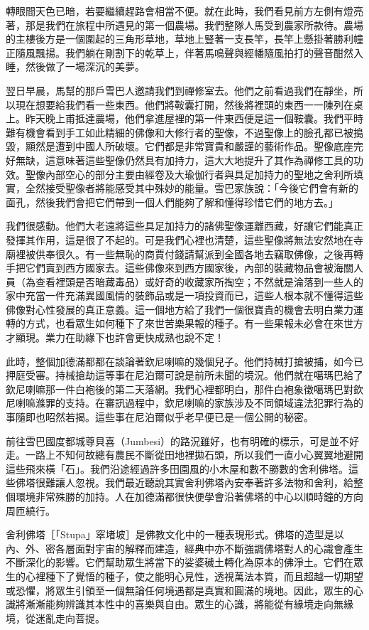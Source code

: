 轉眼間天色已暗，若要繼續趕路會相當不便。就在此時，我們看見前方左側有燈亮著，那是我們在旅程中所遇見的第一個農場。我們整隊人馬受到農家所款待。農場的主樓後方是一個圍起的三角形草地，草地上豎著一支長竿，長竿上懸掛著勝利幢正隨風飄揚。我們躺在剛割下的乾草上，伴著馬鳴聲與經幡隨風拍打的聲音酣然入睡，然後做了一場深沉的美夢。

翌日早晨，馬幫的那戶雪巴人邀請我們到禪修室去。他們之前看過我們在靜坐，所以現在想要給我們看一些東西。他們將鞍囊打開，然後將裡頭的東西一一陳列在桌上。昨天晚上甫抵達農場，他們拿進屋裡的第一件東西便是這一個鞍囊。我們平時難有機會看到手工如此精細的佛像和大修行者的聖像，不過聖像上的臉孔都已被搗毀，顯然是遭到中國人所破壞。它們都是非常寶貴和嚴謹的藝術作品。聖像底座完好無缺，這意味著這些聖像仍然具有加持力，這大大地提升了其作為禪修工具的功效。聖像內部空心的部分主要由經卷及大瑜伽行者與具足加持力的聖地之舍利所填實，全然接受聖像者將能感受其中殊妙的能量。雪巴家族說：「今後它們會有新的面孔，然後我們會把它們帶到一個人們能夠了解和懂得珍惜它們的地方去。」

我們很感動。他們大老遠將這些具足加持力的諸佛聖像運離西藏，好讓它們能真正發揮其作用，這是很了不起的。可是我們心裡也清楚，這些聖像將無法安然地在寺廟裡被供奉很久。有一些無恥的商賈付錢請幫派到全國各地去竊取佛像，之後再轉手把它們賣到西方國家去。這些佛像來到西方國家後，內部的裝藏物品會被海關人員（為查看裡頭是否暗藏毒品）或好奇的收藏家所掏空；不然就是淪落到一些人的家中充當一件充滿異國風情的裝飾品或是一項投資而已，這些人根本就不懂得這些佛像對心性發展的真正意義。這一個地方給了我們一個很寶貴的機會去明白業力運轉的方式，也看眾生如何種下了來世苦樂果報的種子。有一些果報未必會在來世方才顯現。業力在助緣下也許會更快成熟也說不定！

此時，整個加德滿都都在談論著欽尼喇嘛的幾個兒子。他們持械打搶被捕，如今已押庭受審。持械搶劫這等事在尼泊爾可說是前所未聞的境況。他們就在噶瑪巴給了欽尼喇嘛那一件白袍後的第二天落網。我們心裡都明白，那件白袍象徵噶瑪巴對欽尼喇嘛滌罪的支持。在審訊過程中，欽尼喇嘛的家族涉及不同領域違法犯罪行為的事隨即也昭然若揭。這些事在尼泊爾似乎老早便已是一個公開的秘密。

前往雪巴國度都城尊貝喜（Jumbesi）的路況雖好，也有明確的標示，可是並不好走。一路上不知何故總有農民不斷從田地裡拋石頭，所以我們一直小心翼翼地避開這些飛來橫「石」。我們沿途經過許多田園風的小木屋和數不勝數的舍利佛塔。這些佛塔很難讓人忽視。我們最近聽說其實舍利佛塔內安奉著許多法物和舍利，給整個環境非常殊勝的加持。人在加德滿都很快便學會沿著佛塔的中心以順時鐘的方向周匝繞行。

舍利佛塔［「Stupa」窣堵坡］是佛教文化中的一種表現形式。佛塔的造型是以內、外、密各層面對宇宙的解釋而建造，經典中亦不斷強調佛塔對人的心識會產生不斷深化的影響。它們幫助眾生將當下的娑婆穢土轉化為原本的佛淨土。它們在眾生的心裡種下了覺悟的種子，使之能明心見性，透視萬法本質，而且超越一切期望或恐懼，將眾生引領至一個無論任何境遇都是真實和圓滿的境地。因此，眾生的心識將漸漸能夠辨識其本性中的喜樂與自由。眾生的心識，將能從有緣境走向無緣境，從迷亂走向菩提。


